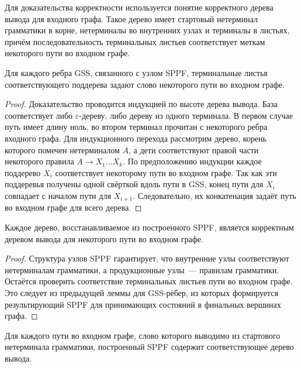 Для доказательства корректности используется понятие корректного дерева вывода для входного графа.
Такое дерево имеет стартовый нетерминал грамматики в корне, нетерминалы во внутренних узлах и терминалы в листьях, причём последовательность терминальных листьев соответствует меткам некоторого пути во входном графе.

\begin{lemma}
    Для каждого ребра GSS, связанного с узлом SPPF, терминальные листья соответствующего поддерева задают слово некоторого пути во входном графе.
\end{lemma}

\begin{proof}
    Доказательство проводится индукцией по высоте дерева вывода.
    База соответствует либо $\varepsilon$-дереву, либо дереву из одного терминала.
    В первом случае путь имеет длину ноль, во втором терминал прочитан с некоторого ребра входного графа.
    Для индукционного перехода рассмотрим дерево, корень которого помечен нетерминалом $A$, а дети соответствуют правой части некоторого правила $A \to X_1 \dots X_k$.
    По предположению индукции каждое поддерево $X_i$ соответствует некоторому пути во входном графе.
    Так как эти поддеревья получены одной свёрткой вдоль пути в GSS, конец пути для $X_i$ совпадает с началом пути для $X_{i+1}$.
    Следовательно, их конкатенация задаёт путь во входном графе для всего дерева.
\end{proof}

\begin{theorem}[Звуковость]
    Каждое дерево, восстанавливаемое из построенного SPPF, является корректным деревом вывода для некоторого пути во входном графе.
\end{theorem}

\begin{proof}
    Структура узлов SPPF гарантирует, что внутренние узлы соответствуют нетерминалам грамматики, а продукционные узлы~--- правилам грамматики.
    Остаётся проверить соответствие терминальных листьев пути во входном графе.
    Это следует из предыдущей леммы для GSS-рёбер, из которых формируется результирующий SPPF для принимающих состояний в финальных вершинах графа.
\end{proof}

\begin{theorem}[Полнота]
    Для каждого пути во входном графе, слово которого выводимо из стартового нетерминала грамматики, построенный SPPF содержит соответствующее дерево вывода.
\end{theorem}


